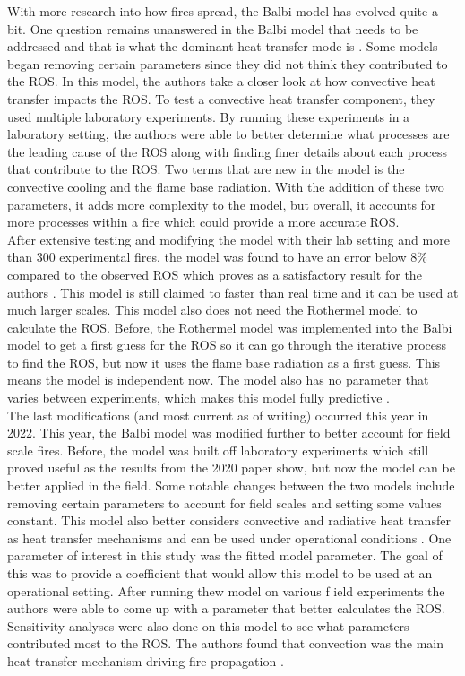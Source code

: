 \documentclass{article}
\begin{document}
\indent With more research into how fires spread, the Balbi model has evolved quite a bit. One question remains unanswered in the Balbi model that needs to be addressed and that is what the dominant heat transfer mode is \cite{Balbi2020}. Some models began removing certain parameters since they did not think they contributed to the ROS. In this model, the authors take a closer look at how convective heat transfer impacts the ROS. To test a convective heat transfer component, they used multiple laboratory experiments. By running these experiments in a laboratory setting, the authors were able to better determine what processes are the leading cause of the ROS along with finding finer details about each process that contribute to the ROS. Two terms that are new in the model is the convective cooling and the flame base radiation. With the addition of these two parameters, it adds more complexity to the model, but overall, it accounts for more processes within a fire which could provide a more accurate ROS. \\
\indent After extensive testing and modifying the model with their lab setting and more than 300 experimental fires, the model was found to have an error below 8\% compared to the observed ROS which proves as a satisfactory result for the authors \cite{Balbi2020}. This model is still claimed to faster than real time and it can be used at much larger scales. This model also does not need the Rothermel model to calculate the ROS. Before, the Rothermel model was implemented into the Balbi model to get a first guess for the ROS so it can go through the iterative process to find the ROS, but now it uses the flame base radiation as a first guess. This means the model is independent now. The model also has no parameter that varies between experiments, which makes this model fully predictive \cite{Chatelon2022}.  \\
\indent The last modifications (and most current as of writing) occurred this year in 2022. This year, the Balbi model was modified further to better account for field scale fires. Before, the model was built off laboratory experiments which still proved useful as the results from the 2020 paper show, but now the model can be better applied in the field. Some notable changes between the two models include removing certain parameters to account for field scales and setting some values constant. This model also better considers convective and radiative heat transfer as heat transfer mechanisms and can be used under operational conditions \cite{Chatelon2022}. One parameter of interest in this study was the fitted model parameter. The goal of this was to provide a coefficient that would allow this model to be used at an operational setting. After running thew model on various f ield experiments the authors were able to come up with a parameter that better calculates the ROS. Sensitivity analyses were also done on this model to see what parameters contributed most to the ROS. The authors found that convection was the main heat transfer mechanism driving fire propagation \cite{Chatelon2022}. \\
\end{document}
